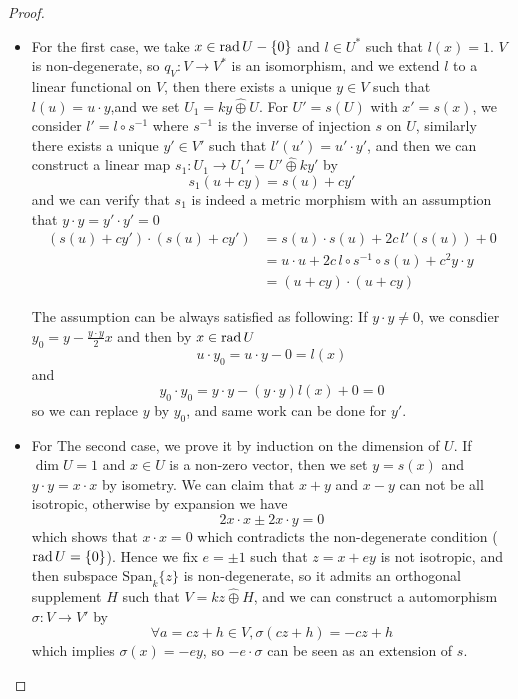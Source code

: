 \begin{proof}
    \begin{itemize}[label=$\blacktriangleright$]
        \item   For the first case, we take \(x \in \operatorname{rad} U - \{0\}\) and \(l \in U^*\) such that \(l(x) = 1\). \(V\) is non-degenerate, so \(q_V: V \to V^*\) is an isomorphism, and we extend \(l\) to a linear functional on \(V\), then there exists a unique \(y \in V\) such that \(l(u) = u \cdot y\),and we set \(U_1 = ky \hat{\oplus} U\). For \(U' = s(U)\) with \(x' =  s(x)\), we consider \(l' = l \circ s^{-1}\) where \(s^{-1}\) is the inverse of injection \(s\) on \(U\), similarly there exists a unique \(y' \in V'\) such that \(l'(u') = u' \cdot y'\), and then we can construct a linear map \(s_1: U_1 \to U_1' = U' \hat{\oplus} k y'\) by
    \[s_1(u+ cy) = s(u) + cy'\]
    and we can verify that \(s_1\) is indeed a metric morphism with an assumption that \(y \cdot y = y' \cdot y' = 0\)
    \begin{align*}
        (s(u) + cy') \cdot (s(u) + cy') &= s(u) \cdot s(u) + 2c \, l'(s(u))+ 0 \\
        &= u \cdot u + 2 c \, l \circ s^{-1} \circ s (u) + c^2 y \cdot y \\
        &= (u + cy) \cdot (u + cy)
    \end{align*}    

    The assumption can be always satisfied as following: If \(y \cdot y \neq 0\), we consdier \(y_0 = y - \frac{y \cdot y}{2} x \) and then by \(x \in \operatorname{rad} U\)
    \[u\cdot y_0= u \cdot y - 0  = l(x)\]
    and 
    \[y_0 \cdot y_0 = y \cdot y -(y\cdot y )l(x) + 0  = 0\]
    so we can replace \(y \) by \(y_0\), and same work can be done for \(
    y'\).

    \item For The second case, we prove it by induction on the dimension of \(U\). If \(\dim U = 1\) and \(x \in U\) is a non-zero vector, then we set \(y = s(x)\) and \(y \cdot y = x \cdot x\) by isometry. We can claim that \(x + y \) and \(x - y\) can not be all isotropic, otherwise by expansion we have
    \[2 x \cdot x \pm 2x \cdot y = 0\]
    which shows that \(x \cdot x  = 0\) which contradicts the non-degenerate condition (\(\operatorname{rad} U = \{0\}\)). Hence we fix \(e  = \pm 1\) such that \(z = x + ey \) is not isotropic, and then subspace \(\mathrm{Span}_k\{z\}\) is non-degenerate, so it admits an orthogonal supplement \(H\) such that \(V = kz \hat{\oplus} H\), and we can construct a automorphism \(\sigma: V \to V'\) by
    \[\forall a = cz + h \in V , \sigma(cz+h) = -cz + h\]
    which implies \(\sigma(x ) = -ey\), so \(-e \cdot \sigma\) can be seen as an extension of \(s\).


\end{itemize}
\end{proof}
